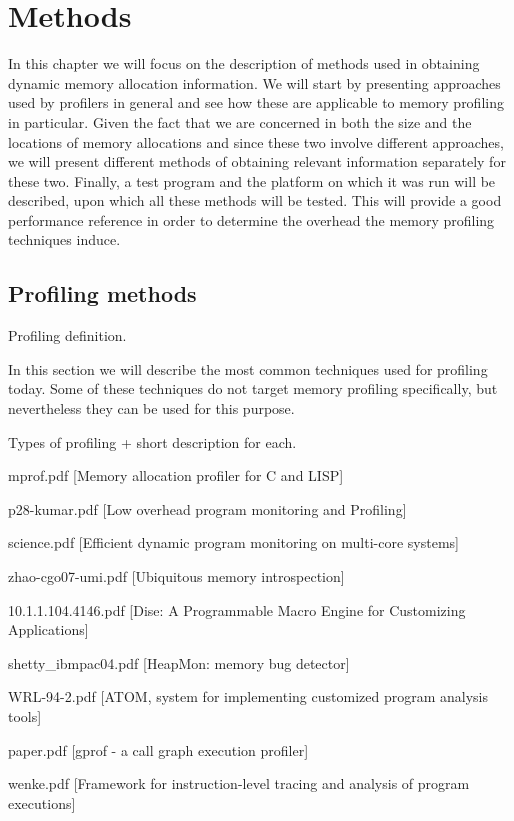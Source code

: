 \chapter{Methods}
\label{chapter:methods}

In this chapter we will focus on the description of methods used in obtaining dynamic memory allocation information. We will start by presenting approaches used by profilers in general and see how these are applicable to memory profiling in particular. Given the fact that we are concerned in both the size and the locations of memory allocations and since these two involve different approaches, we will present different methods of obtaining relevant information separately for these two. Finally, a test program and the platform on which it was run will be described, upon which all these methods will be tested. This will provide a good performance reference in order to determine the overhead the memory profiling techniques induce.

\section{Profiling methods}
\label{section:profilingmethods}

Profiling definition.

In this section we will describe the most common techniques used for profiling today. Some of these techniques do not target memory profiling specifically, but nevertheless they can be used for this purpose.

Types of profiling + short description for each.

mprof.pdf [Memory allocation profiler for C and LISP]

p28-kumar.pdf [Low overhead program monitoring and Profiling]

science.pdf [Efficient dynamic program monitoring on multi-core systems]

zhao-cgo07-umi.pdf [Ubiquitous memory introspection]

10.1.1.104.4146.pdf [Dise: A Programmable Macro Engine for Customizing Applications]

shetty\_ibmpac04.pdf [HeapMon: memory bug detector]

WRL-94-2.pdf [ATOM, system for implementing customized program analysis tools]

paper.pdf [gprof - a call graph execution profiler]

wenke.pdf [Framework for instruction-level tracing and analysis of program executions]

